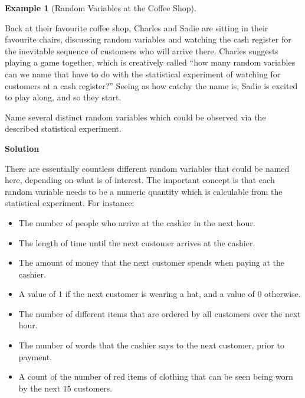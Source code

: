 \documentclass[
  letterpaper,
  DIV=11,
  numbers=noendperiod]{scrreprt}
\providecommand{\tightlist}{%
  \setlength{\itemsep}{0pt}\setlength{\parskip}{0pt}}\usepackage{longtable,booktabs,array}
\theoremstyle{definition}
\theoremstyle{definition}
\theoremstyle{definition}
\newtheorem{example}{Example}[chapter]
\theoremstyle{remark}
\begin{document}
\begin{example}[Random Variables at the Coffee
Shop]\protect\hypertarget{exm-random-var}{}\label{exm-random-var}

Back at their favourite coffee shop, Charles and Sadie are sitting in
their favourite chairs, discussing random variables and watching the
cash register for the inevitable sequence of customers who will arrive
there. Charles suggests playing a game together, which is creatively
called ``how many random variables can we name that have to do with the
statistical experiment of watching for customers at a cash register?''
Seeing as how catchy the name is, Sadie is excited to play along, and so
they start.

Name several distinct random variables which could be observed via the
described statistical experiment.

\begin{tcolorbox}[enhanced jigsaw, colback=white, breakable, rightrule=.15mm, leftrule=.75mm, toprule=.15mm, left=2mm, arc=.35mm, opacityback=0, bottomrule=.15mm]

\vspace{-3mm}\textbf{Solution}\vspace{3mm}

There are essentially countless different random variables that could be
named here, depending on what is of interest. The important concept is
that each random variable needs to be a numeric quantity which is
calculable from the statistical experiment. For instance:

\begin{itemize}
\tightlist
\item
  The number of people who arrive at the cashier in the next hour.
\item
  The length of time until the next customer arrives at the cashier.
\item
  The amount of money that the next customer spends when paying at the
  cashier.
\item
  A value of \(1\) if the next customer is wearing a hat, and a value of
  \(0\) otherwise.
\item
  The number of different items that are ordered by all customers over
  the next hour.
\item
  The number of words that the cashier says to the next customer, prior
  to payment.
\item
  A count of the number of red items of clothing that can be seen being
  worn by the next \(15\) customers.
\end{itemize}

\end{tcolorbox}

\end{example}
\end{document}
